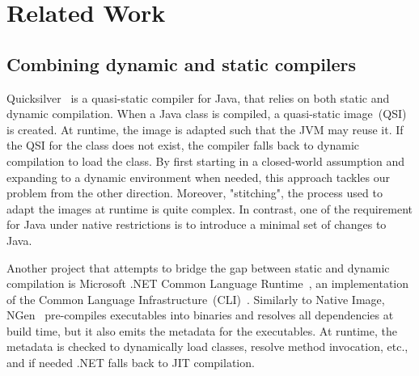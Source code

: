 \chapter{Related Work}


\section{Combining dynamic and static compilers}
Quicksilver~\cite{serrano_quicksilver_2000} is a quasi-static compiler for Java, that relies on both static and dynamic compilation. 
When a Java class is compiled, a quasi-static image~(QSI) is created. At runtime, the image is adapted such that the JVM may reuse it. If the QSI for the class does not exist, the compiler falls back to dynamic compilation to load the class. 
By first starting in a closed-world assumption and expanding to a dynamic environment when needed, this approach tackles our problem from the other direction.
Moreover, "stitching", the process used to adapt the images at runtime is quite complex. In contrast, one of the requirement for Java under native restrictions is to introduce a minimal set of changes to Java.

Another project that attempts to bridge the gap between static and dynamic compilation is Microsoft .NET Common Language Runtime~\cite{noauthor_common_2023}, an implementation of the Common Language Infrastructure~(CLI)~\cite{noauthor_common_2012}. 
Similarly to Native Image, NGen~\cite{noauthor_clr_2019} pre-compiles executables into binaries and resolves all dependencies at build time, but it also emits the metadata for the executables. At runtime, the metadata is checked to dynamically load classes, resolve method invocation, etc., and if needed .NET falls back to JIT compilation.

